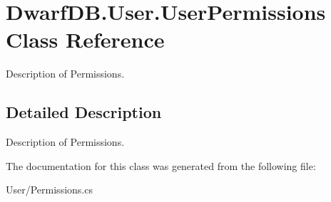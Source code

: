 \hypertarget{class_dwarf_d_b_1_1_user_1_1_user_permissions}{
\section{DwarfDB.User.UserPermissions Class Reference}
\label{class_dwarf_d_b_1_1_user_1_1_user_permissions}
}


Description of Permissions.  




\subsection{Detailed Description}
Description of Permissions. 

The documentation for this class was generated from the following file:\begin{DoxyCompactItemize}
\item 
User/Permissions.cs\end{DoxyCompactItemize}
